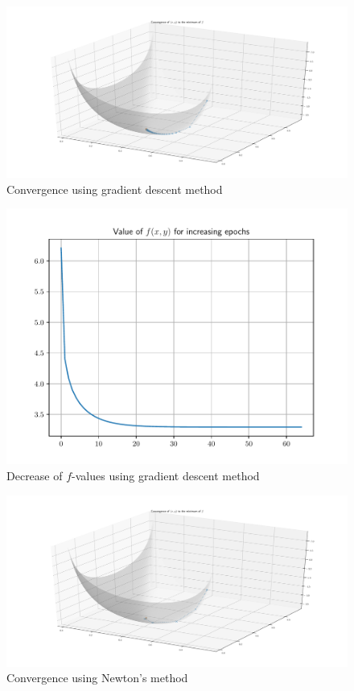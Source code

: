 \documentclass[letterpaper,headings=standardclasses]{scrartcl}
\begin{document}
\pagebreak

\begin{figure}[H]
\includegraphics[width=1.2\linewidth,center]{gd_graph.pdf}
\caption{Convergence using gradient descent method}
\label{gd_graph}
\end{figure}

\begin{figure}[H]
\centering
\includegraphics[width=.6\linewidth]{gd_fval.pdf}
\caption{Decrease of $f$-values using gradient descent method}
\label{gd_fval}
\end{figure}

\begin{figure}[H]
\includegraphics[width=1.2\linewidth,center]{nm_graph.pdf}
\caption{Convergence using Newton's method}
\label{nm_graph}
\end{figure}
\end{document}
